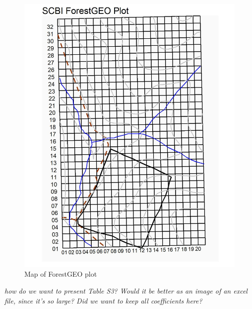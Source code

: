 \documentclass[]{article}
\begin{document}
\begin{figure}[ht]
\includegraphics[width=1\linewidth]{tables_figures/ForestGEO_plot} \caption{Map of ForestGEO plot}\label{fig:Plot}
\end{figure}

\emph{how do we want to present Table S3? Would it be better as an image
of an excel file, since it's so large? Did we want to keep all
coefficients here?}
\end{document}
